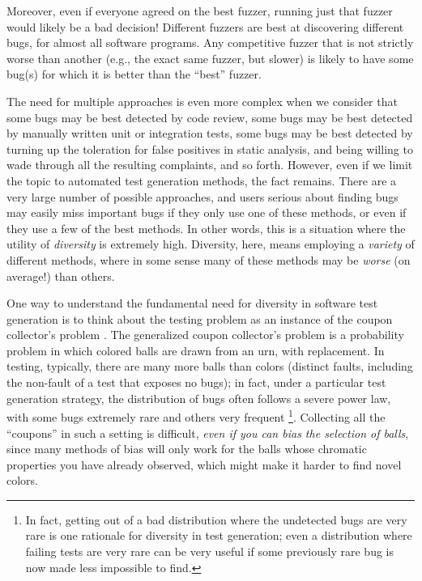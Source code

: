 \documentclass[sigplan]{acmart}
\begin{document}
Moreover, even if everyone agreed on the best fuzzer, running just
that fuzzer would likely be a bad decision!  Different fuzzers are
best at discovering different bugs, for almost all software programs.
Any competitive fuzzer that is not strictly worse than another (e.g.,
the exact same fuzzer, but slower) is likely to have some bug(s) for
which it is better than the ``best'' fuzzer.

The need for multiple approaches is even more complex when we consider
that some bugs may be best detected by code review, some bugs may be
best detected by manually written unit or integration tests, some bugs
may be best detected by turning up the toleration for false positives
in static analysis, and being willing to wade through all the
resulting complaints, and so forth.  However, even if we limit the
topic to automated test generation methods, the fact remains.  There
are a very large number of possible approaches, and users serious
about finding bugs may easily miss important bugs if they only use one
of these methods, or even if they use a few of the best methods.  In
other words, this is a situation where the utility of \emph{diversity}
is extremely high.  Diversity, here, means employing a \emph{variety} of different
methods, where in some sense many of these methods may be \emph{worse}
(on average!) than others.

One way to understand the fundamental need for diversity in software
test generation is to think about the testing problem as an instance
of the coupon collector's problem \cite{FormalCoupon}.  The
generalized coupon
collector's problem \cite{coupon} is a probability problem in which
colored balls are drawn from an urn, with replacement.  In testing,
typically, there are many more balls than colors (distinct faults,
including the non-fault of a test that exposes no bugs); in fact,
under a particular test generation strategy, the distribution of bugs
often follows a severe power law, with some bugs extremely rare and
others very frequent \cite{Taming}\footnote{In fact, getting out of a
  bad distribution where the undetected bugs are very rare is one
  rationale for diversity in test generation; even a distribution
  where failing tests are very rare can be very useful if some
  previously rare bug is now made less impossible to find.}.
Collecting all the ``coupons'' in such a setting is difficult, \emph{even if
you can bias the selection of balls}, since many methods of bias will
only work for the balls whose chromatic properties you have already
observed, which might make it harder to find novel colors.
\end{document}
